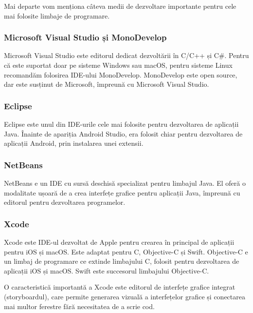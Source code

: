 Mai departe vom menționa câteva medii de dezvoltare importante pentru cele mai folosite limbaje de programare.

\subsubsection{Microsoft Visual Studio și MonoDevelop}
\label{sec:appdev:dev:ide:mono}

Microsoft Visual Studio este editorul dedicat dezvoltării în C/C++ și C\#.
 Pentru că este suportat doar pe sisteme Windows sau macOS, pentru sisteme Linux recomandăm folosirea IDE-ului MonoDevelop.
MonoDevelop este open source, dar este susținut de Microsoft, împreună cu Microsoft Visual Studio.

\subsubsection{Eclipse}
\label{sec:appdev:dev:ide:eclipse}

Eclipse este unul din IDE-urile cele mai folosite pentru dezvoltarea de aplicații Java.
Înainte de apariția Android Studio, era folosit chiar pentru dezvoltarea de aplicații Android, prin instalarea unei extensii.

\subsubsection{NetBeans}
\label{sec:appdev:dev:ide:netbeans}

NetBeans e un IDE cu sursă deschisă specializat pentru limbajul Java.
El oferă o modalitate ușoară de a crea interfețe grafice pentru aplicații Java, împreună cu editorul pentru dezvoltarea programelor.

\subsubsection{Xcode}
\label{sec:appdev:dev:ide:xcode}

Xcode este IDE-ul dezvoltat de Apple pentru crearea în principal de aplicații pentru iOS și macOS.
Este adaptat pentru C, Objective-C și Swift.
Objective-C e un limbaj de programare ce extinde limbajului C, folosit pentru dezvoltarea de aplicații iOS și macOS.
Swift este succesorul limbajului Objective-C.

O caracteristică importantă a Xcode este editorul de interfețe grafice integrat (storyboardul), care permite generarea vizuală a interfețelor grafice și conectarea mai multor ferestre fără necesitatea de a scrie cod.

